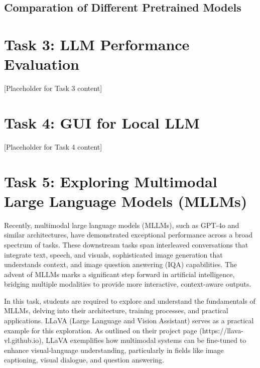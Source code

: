\documentclass[12pt,a4paper]{article}
\begin{document}
\subsection{Comparation of Different Pretrained Models}



\section{Task 3: LLM Performance Evaluation}

[Placeholder for Task 3 content]

\section{Task 4: GUI for Local LLM}

[Placeholder for Task 4 content]

\section{Task 5: Exploring Multimodal Large Language Models (MLLMs)}

Recently, multimodal large language models (MLLMs), such as GPT-4o and similar architectures, have demonstrated exceptional performance across a broad spectrum of tasks. These downstream tasks span interleaved conversations that integrate text, speech, and visuals, sophisticated image generation that understands context, and image question answering (IQA) capabilities. The advent of MLLMs marks a significant step forward in artificial intelligence, bridging multiple modalities to provide more interactive, context-aware outputs.

In this task, students are required to explore and understand the fundamentals of MLLMs, delving into their architecture, training processes, and practical applications. LLaVA (Large Language and Vision Assistant) serves as a practical example for this exploration. As outlined on their project page (https://llava-vl.github.io), LLaVA exemplifies how multimodal systems can be fine-tuned to enhance visual-language understanding, particularly in fields like image captioning, visual dialogue, and question answering.
\end{document}
